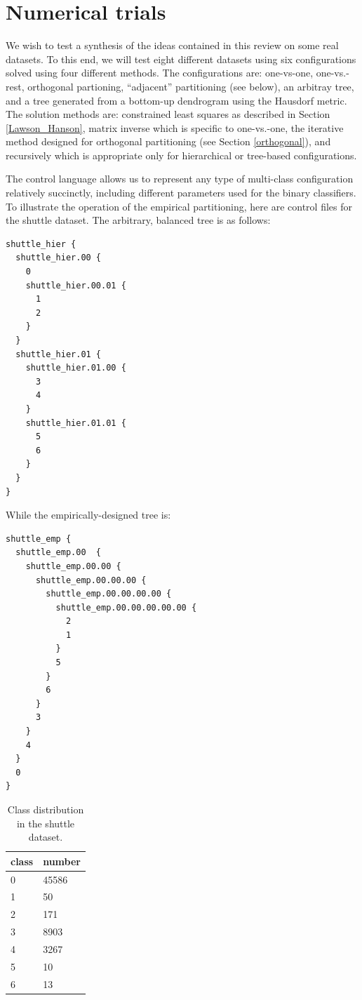 \section{Numerical trials}

We wish to test a synthesis of the ideas contained in this review on some real
datasets.
To this end, we will test eight different datasets using six configurations 
solved using four different methods.
The configurations are: one-vs-one, one-vs.-rest, orthogonal partioning,
``adjacent'' partitioning (see below), an arbitray tree, and a tree generated
from a bottom-up dendrogram using the Hausdorf metric.
The solution methods are: constrained least squares as described
in Section \ref{Lawson_Hanson}, matrix inverse which is specific to one-vs.-one,
the iterative method designed for orthogonal partitioning 
(see Section \ref{orthogonal}), and recursively which is appropriate
only for hierarchical or tree-based configurations.

The control language allows us to represent any type of multi-class 
configuration relatively succinctly, including different parameters
used for the binary classifiers.
To illustrate the operation of the empirical partitioning, here are
control files for the shuttle dataset.
The arbitrary, balanced tree is as follows:
\begin{verbatim}
shuttle_hier {
  shuttle_hier.00 {
    0
    shuttle_hier.00.01 {
      1
      2
    }
  }
  shuttle_hier.01 {
    shuttle_hier.01.00 {
      3
      4
    }
    shuttle_hier.01.01 {
      5
      6
    }
  }
}

\end{verbatim}

While the empirically-designed tree is:
\begin{verbatim}
shuttle_emp {
  shuttle_emp.00  {
    shuttle_emp.00.00 {
      shuttle_emp.00.00.00 {
        shuttle_emp.00.00.00.00 {
          shuttle_emp.00.00.00.00.00 {
            2
            1
          }
          5
        }
        6
      }
      3
    }
    4
  }
  0
}
\end{verbatim}

\begin{table}
	\caption{Class distribution in the shuttle dataset.}
	\label{shuttle_dist}
	\begin{center}
	\begin{tabular}{|ll|}
		\hline
		class & number \\
		\hline
		0 & 45586 \\
		1 & 50 \\
		2 & 171 \\
		3 & 8903 \\
		4 & 3267 \\
		5 & 10 \\
		6 & 13 \\
		\hline
	\end{tabular}
	\end{center}
\end{table}

